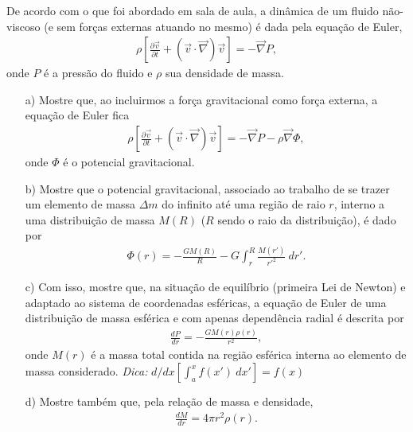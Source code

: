 \documentclass[a4paper,12pt]{article}
\begin{document}
{}

\indent \par De acordo com o que foi abordado em sala de aula, a dinâmica de um fluido não-viscoso (e sem forças externas atuando no mesmo) é dada pela equação de Euler,
%
\begin{eqnarray}
\nonumber
\rho \left[ \frac{\partial \vec{v}}{\partial t} + (\vec{v}\cdot \vec{\nabla})\vec{v} \right]= -\vec{\nabla}P,
\end{eqnarray}
%
\noindent onde $P$ é a pressão do fluido e $\rho$ sua densidade de massa.
%
\begin{itemize}
 \item[a)] Mostre que, ao incluirmos a força gravitacional como força externa, a equação de Euler fica 
%
%
\begin{eqnarray}
\nonumber
\rho \left[ \frac{\partial \vec{v}}{\partial t} + (\vec{v}\cdot \vec{\nabla})\vec{v} \right]= -\vec{\nabla}P  -\rho \vec{\nabla}\Phi,
\end{eqnarray}
%
\noindent onde $\Phi$ é o potencial gravitacional.
%
\item[b)] Mostre que o potencial gravitacional, associado ao trabalho de se trazer um elemento de massa $\Delta m$ do infinito até uma região de raio $r$, interno a uma distribuição de massa $M(R)$ ($R$ sendo o raio da distribuição), é dado por
%
\begin{eqnarray}
\nonumber
\Phi(r)= - \frac{GM(R)}{R} - G \int_{r}^{R} \frac{M(r')}{r'^{2}}  ~ dr'.
\end{eqnarray}
%
\item[c)] Com isso, mostre que, na situação de equilíbrio (primeira Lei de Newton) e adaptado ao sistema de coordenadas esféricas, a equação de Euler de uma distribuição de massa esférica e com apenas dependência radial é descrita por
%
\begin{eqnarray}
\nonumber
\frac{dP}{dr} = -\frac{GM(r)\rho (r)}{r^2},
\end{eqnarray}
%
\noindent onde $M(r)$ é a massa total contida na região esférica interna ao elemento de massa considerado. {\it{Dica:}} $d/dx [\int_{a}^{x} f(x')~dx']=f(x)$
%
\item[d)] Mostre também que, pela relação de massa e densidade,
\begin{eqnarray}
\nonumber
\frac{dM}{dr} = 4\pi r^2 \rho(r).\\
\nonumber
\end{eqnarray}
%
\end{itemize}
\end{document}
